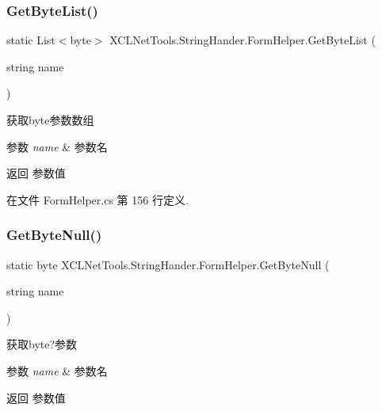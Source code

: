 \subsubsection{\texorpdfstring{Get\+Byte\+List()}{GetByteList()}}
{\footnotesize\ttfamily static List$<$byte$>$ X\+C\+L\+Net\+Tools.\+String\+Hander.\+Form\+Helper.\+Get\+Byte\+List (\begin{DoxyParamCaption}\item[{string}]{name }\end{DoxyParamCaption})\hspace{0.3cm}{\ttfamily [static]}}



获取byte参数数组 


\begin{DoxyParams}{参数}
{\em name} & 参数名\\
\hline
\end{DoxyParams}
\begin{DoxyReturn}{返回}
参数值
\end{DoxyReturn}


在文件 Form\+Helper.\+cs 第 156 行定义.

\mbox{\label{class_x_c_l_net_tools_1_1_string_hander_1_1_form_helper_a9d43824d313342bfc66623f548ad6ad6}} 
\subsubsection{\texorpdfstring{Get\+Byte\+Null()}{GetByteNull()}\hspace{0.1cm}{\footnotesize\ttfamily [1/2]}}
{\footnotesize\ttfamily static byte X\+C\+L\+Net\+Tools.\+String\+Hander.\+Form\+Helper.\+Get\+Byte\+Null (\begin{DoxyParamCaption}\item[{string}]{name }\end{DoxyParamCaption})\hspace{0.3cm}{\ttfamily [static]}}



获取byte?参数 


\begin{DoxyParams}{参数}
{\em name} & 参数名\\
\hline
\end{DoxyParams}
\begin{DoxyReturn}{返回}
参数值
\end{DoxyReturn}


